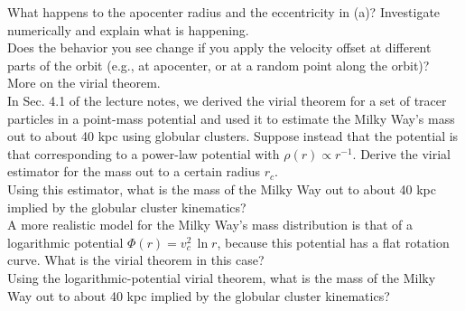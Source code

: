 \documentclass[12pt]{article}
\begin{document}
 What happens to the apocenter radius and the
eccentricity in (a)? Investigate numerically and explain what is
happening.\\

 Does the behavior you see change if you apply the
velocity offset at different parts of the orbit (e.g., at apocenter,
or at a random point along the orbit)?\\

 More on the virial theorem.\\

 In Sec. 4.1 of the lecture notes, we derived the
virial theorem for a set of tracer particles in a point-mass potential
and used it to estimate the Milky Way's mass out to about 40 kpc using
globular clusters. Suppose instead that the potential is that
corresponding to a power-law potential with $\rho(r) \propto
r^{-1}$. Derive the virial estimator for the mass out to a certain
radius $r_c$.\\

 Using this estimator, what is the mass of the Milky
Way out to about 40 kpc implied by the globular cluster kinematics?\\

 A more realistic model for the Milky Way's mass
distribution is that of a logarithmic potential $\Phi(r) = v_c^2 \,\ln
r$, because this potential has a flat rotation curve. What is the
virial theorem in this case?\\

 Using the logarithmic-potential virial theorem,
what is the mass of the Milky Way out to about 40 kpc implied by the
globular cluster kinematics?\\
\end{document}
